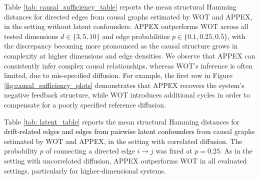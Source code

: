 \documentclass[twoside,11pt]{article}
\newcommand{\rv}[1]{\textcolor{black}{#1}}
\begin{document}
Table \ref{tab: causal_sufficiency_table} reports the mean structural Hamming distances for directed edges from causal graphs estimated by WOT and APPEX, in the setting without latent confounders. APPEX outperforms WOT across all tested dimensions $d \in \{3, 5, 10\}$ and edge probabilities $p \in \{0.1, 0.25, 0.5\}$, with the discrepancy becoming more pronounced as the causal structure grows in complexity at higher dimensions and edge densities. We observe that APPEX can consistently infer complex causal relationships, whereas WOT's inference is often limited, due to mis-specified diffusion. For example, the first row in Figure  \ref{fig:causal_sufficiency_plots} demonstrates that APPEX recovers the system's negative feedback structure, while WOT introduces additional cycles in order to compensate for a poorly specified reference diffusion.

Table \ref{tab: latent_table} reports the mean structural Hamming distances for \rv{drift-related edges and edges from pairwise latent confounders} from causal graphs estimated by WOT and APPEX, in the setting with correlated diffusion. The probability $p$ of connecting a directed edge $i \to j$ was fixed at $p=0.25$. As in the setting with uncorrelated diffusion, APPEX outperforms WOT in all evaluated settings, particularly for higher-dimensional systems. 









\end{document}
